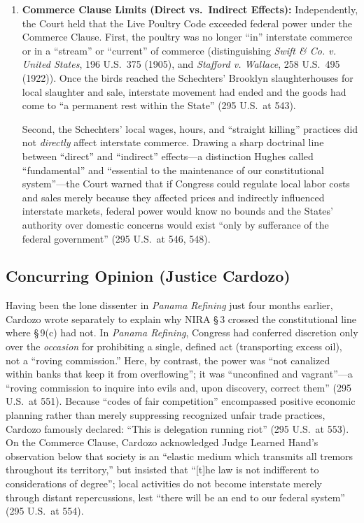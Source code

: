 \documentclass[12pt]{article}
\begin{document}
\begin{enumerate}
  \item \textbf{Commerce Clause Limits (Direct vs.\ Indirect Effects):} Independently, the Court held that the Live Poultry Code exceeded federal power under the Commerce Clause. First, the poultry was no longer ``in'' interstate commerce or in a ``stream'' or ``current'' of commerce (distinguishing \textit{Swift \& Co. v. United States}, 196 U.S.\ 375 (1905), and \textit{Stafford v. Wallace}, 258 U.S.\ 495 (1922)). Once the birds reached the Schechters' Brooklyn slaughterhouses for local slaughter and sale, interstate movement had ended and the goods had come to ``a permanent rest within the State'' (295 U.S.\ at 543).

  Second, the Schechters' local wages, hours, and ``straight killing'' practices did not \textit{directly} affect interstate commerce. Drawing a sharp doctrinal line between ``direct'' and ``indirect'' effects---a distinction Hughes called ``fundamental'' and ``essential to the maintenance of our constitutional system''---the Court warned that if Congress could regulate local labor costs and sales merely because they affected prices and indirectly influenced interstate markets, federal power would know no bounds and the States' authority over domestic concerns would exist ``only by sufferance of the federal government'' (295 U.S.\ at 546, 548).
\end{enumerate}

\subsection{Concurring Opinion (Justice Cardozo)}

Having been the lone dissenter in \textit{Panama Refining} just four months earlier, Cardozo wrote separately to explain why NIRA \S\,3 crossed the constitutional line where \S\,9(c) had not. In \textit{Panama Refining}, Congress had conferred discretion only over the \textit{occasion} for prohibiting a single, defined act (transporting excess oil), not a ``roving commission.'' Here, by contrast, the power was ``not canalized within banks that keep it from overflowing''; it was ``unconfined and vagrant''---a ``roving commission to inquire into evils and, upon discovery, correct them'' (295 U.S.\ at 551). Because ``codes of fair competition'' encompassed positive economic planning rather than merely suppressing recognized unfair trade practices, Cardozo famously declared: ``This is delegation running riot'' (295 U.S.\ at 553). On the Commerce Clause, Cardozo acknowledged Judge Learned Hand's observation below that society is an ``elastic medium which transmits all tremors throughout its territory,'' but insisted that ``[t]he law is not indifferent to considerations of degree''; local activities do not become interstate merely through distant repercussions, lest ``there will be an end to our federal system'' (295 U.S.\ at 554).
\end{document}
